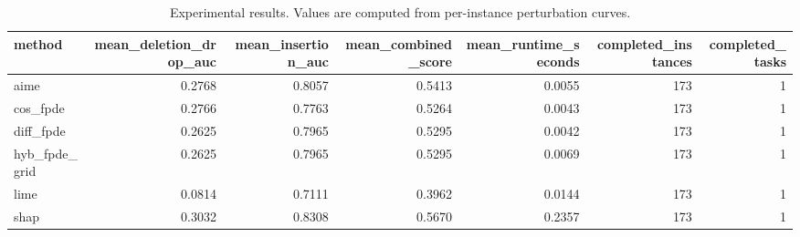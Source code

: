 \begin{table}[t]
\caption{Experimental results. Values are computed from per-instance perturbation curves.}
\label{tab:main_results_computed}
\centering
\begin{tabular}{lrrrrrr}
\toprule
method & mean\_deletion\_drop\_auc & mean\_insertion\_auc & mean\_combined\_score & mean\_runtime\_seconds & completed\_instances & completed\_tasks \\
\midrule
aime & 0.2768 & 0.8057 & 0.5413 & 0.0055 & 173 & 1 \\
cos\_fpde & 0.2766 & 0.7763 & 0.5264 & 0.0043 & 173 & 1 \\
diff\_fpde & 0.2625 & 0.7965 & 0.5295 & 0.0042 & 173 & 1 \\
hyb\_fpde\_grid & 0.2625 & 0.7965 & 0.5295 & 0.0069 & 173 & 1 \\
lime & 0.0814 & 0.7111 & 0.3962 & 0.0144 & 173 & 1 \\
shap & 0.3032 & 0.8308 & 0.5670 & 0.2357 & 173 & 1 \\
\bottomrule
\end{tabular}

\end{table}
